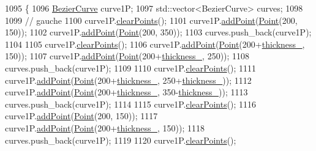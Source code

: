 \begin{DoxyCode}
1095               \{
1096     \mbox{\hyperlink{class_bezier_curve}{BezierCurve}} curve1P;
1097     std::vector<BezierCurve> curves;
1098 
1099     \textcolor{comment}{// gauche}
1100     curve1P.\mbox{\hyperlink{class_bezier_curve_a0ba8ce66d5af5971ae6a1b506029728e}{clearPoints}}();
1101     curve1P.\mbox{\hyperlink{class_bezier_curve_a38d16c18b36ae45619b05e26e226cf34}{addPoint}}(\mbox{\hyperlink{class_point}{Point}}(200, 150));
1102     curve1P.\mbox{\hyperlink{class_bezier_curve_a38d16c18b36ae45619b05e26e226cf34}{addPoint}}(\mbox{\hyperlink{class_point}{Point}}(200, 350));
1103     curves.push\_back(curve1P);
1104 
1105     curve1P.\mbox{\hyperlink{class_bezier_curve_a0ba8ce66d5af5971ae6a1b506029728e}{clearPoints}}();
1106     curve1P.\mbox{\hyperlink{class_bezier_curve_a38d16c18b36ae45619b05e26e226cf34}{addPoint}}(\mbox{\hyperlink{class_point}{Point}}(200+\mbox{\hyperlink{class_font_v1_aed8040e76be9a52833627b92f0fb4e5f}{thickness\_}}, 150));
1107     curve1P.\mbox{\hyperlink{class_bezier_curve_a38d16c18b36ae45619b05e26e226cf34}{addPoint}}(\mbox{\hyperlink{class_point}{Point}}(200+\mbox{\hyperlink{class_font_v1_aed8040e76be9a52833627b92f0fb4e5f}{thickness\_}}, 250));
1108     curves.push\_back(curve1P);
1109 
1110     curve1P.\mbox{\hyperlink{class_bezier_curve_a0ba8ce66d5af5971ae6a1b506029728e}{clearPoints}}();
1111     curve1P.\mbox{\hyperlink{class_bezier_curve_a38d16c18b36ae45619b05e26e226cf34}{addPoint}}(\mbox{\hyperlink{class_point}{Point}}(200+\mbox{\hyperlink{class_font_v1_aed8040e76be9a52833627b92f0fb4e5f}{thickness\_}}, 250+\mbox{\hyperlink{class_font_v1_aed8040e76be9a52833627b92f0fb4e5f}{thickness\_}}));
1112     curve1P.\mbox{\hyperlink{class_bezier_curve_a38d16c18b36ae45619b05e26e226cf34}{addPoint}}(\mbox{\hyperlink{class_point}{Point}}(200+\mbox{\hyperlink{class_font_v1_aed8040e76be9a52833627b92f0fb4e5f}{thickness\_}}, 350-\mbox{\hyperlink{class_font_v1_aed8040e76be9a52833627b92f0fb4e5f}{thickness\_}}));
1113     curves.push\_back(curve1P);
1114 
1115     curve1P.\mbox{\hyperlink{class_bezier_curve_a0ba8ce66d5af5971ae6a1b506029728e}{clearPoints}}();
1116     curve1P.\mbox{\hyperlink{class_bezier_curve_a38d16c18b36ae45619b05e26e226cf34}{addPoint}}(\mbox{\hyperlink{class_point}{Point}}(200, 150));
1117     curve1P.\mbox{\hyperlink{class_bezier_curve_a38d16c18b36ae45619b05e26e226cf34}{addPoint}}(\mbox{\hyperlink{class_point}{Point}}(200+\mbox{\hyperlink{class_font_v1_aed8040e76be9a52833627b92f0fb4e5f}{thickness\_}}, 150));
1118     curves.push\_back(curve1P);
1119 
1120     curve1P.\mbox{\hyperlink{class_bezier_curve_a0ba8ce66d5af5971ae6a1b506029728e}{clearPoints}}();

\end{DoxyCode}
